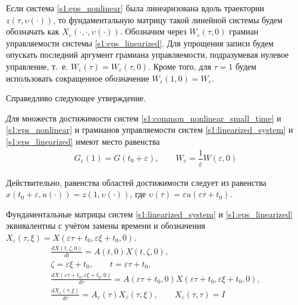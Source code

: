 \documentclass[../main.tex]{subfiles}
\begin{document}
Если система \eqref{s1:eps_nonlinear} была линеаризована вдоль траектории $ z(\tau, \upsilon(\cdot)) $, то фундаментальную матрицу такой линейной системы будем обозначать как $X_{\varepsilon}(\cdot,\cdot, \upsilon(\cdot)) $.
Обозначим через $ W_{\varepsilon}(\tau, 0) $ грамиан управляемости системы \eqref{s1:eps_linearized}. 
Для упрощения записи будем опускать последний аргумент грамиана управляемости, подразумевая нулевое управление, т.~е. $W_{\varepsilon}(\tau) = W_{\varepsilon}(\tau, 0) $.
Кроме того, для $\tau = 1$ будем использовать сокращенное обозначение $W_{\varepsilon}(1, 0) = W_{\varepsilon}$. 

Справедливо следующее утверждение.

\begin{utv}\label{s1:utv:connection_with_scaled_system}
 {\textit Для множеств достижимости систем \eqref{s1:common_nonlinear_small_time} и \eqref{s1:eps_nonlinear} и грамианов управляемости систем \eqref{s1:linearized_system} и \eqref{s1:eps_linearized} имеют место равенства}
 \begin{gather*}
 G_{\varepsilon}(1) = G(t_0 + \varepsilon), \qquad
 W_{\varepsilon} = \dfrac{1}{\varepsilon} W(\varepsilon, 0)
 \end{gather*}
\end{utv}

\doc 
Действительно, равенства областей достижимости следует из равенства $ x(t_0 + \varepsilon, u(\cdot)) = z(1, \upsilon(\cdot)) $, где $ \upsilon(\tau) = \varepsilon u(\varepsilon \tau + t_0) $.

Фундаментальные матрицы систем \eqref{s1:linearized_system} и \eqref{s1:eps_linearized} эквивалентны с учётом замены времени и обозначения $ X_{\varepsilon}(\tau,\xi) = X(\varepsilon \tau + t_0,\varepsilon \xi + t_0, 0) $.
\begin{gather*}
	\frac{dX(t,\zeta, 0)}{dt} = A(t, 0) X(t,\zeta, 0), \\
	\zeta = \varepsilon \xi + t_0, \qquad t = \varepsilon \tau + t_0, \\
	\frac{dX(\varepsilon \tau + t_0, \varepsilon \xi + t_0, 0)}{d\tau} = A(\varepsilon \tau + t_0, 0) X(\varepsilon \tau + t_0,\varepsilon \xi + t_0, 0), \\
	\frac{dX_{ \varepsilon}(\tau,\xi)}{d\tau} = A_{\varepsilon}(\tau) X_{ \varepsilon}(\tau,\xi), \qquad X_{\varepsilon}(\tau,\tau) = I
\end{gather*}
\end{document}
